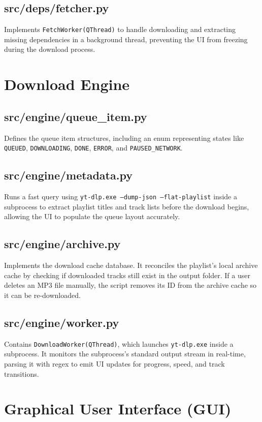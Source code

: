 \documentclass[12pt]{report}
\begin{document}
\subsection{src/deps/fetcher.py}
Implements \texttt{FetchWorker(QThread)} to handle downloading and extracting missing dependencies in a background thread, preventing the UI from freezing during the download process.

\section{Download Engine}

\subsection{src/engine/queue\_item.py}
Defines the queue item structures, including an enum representing states like \texttt{QUEUED}, \texttt{DOWNLOADING}, \texttt{DONE}, \texttt{ERROR}, and \texttt{PAUSED\_NETWORK}.

\subsection{src/engine/metadata.py}
Runs a fast query using \texttt{yt-dlp.exe --dump-json --flat-playlist} inside a subprocess to extract playlist titles and track lists before the download begins, allowing the UI to populate the queue layout accurately.

\subsection{src/engine/archive.py}
Implements the download cache database. It reconciles the playlist's local archive cache by checking if downloaded tracks still exist in the output folder. If a user deletes an MP3 file manually, the script removes its ID from the archive cache so it can be re-downloaded.

\subsection{src/engine/worker.py}
Contains \texttt{DownloadWorker(QThread)}, which launches \texttt{yt-dlp.exe} inside a subprocess. It monitors the subprocess's standard output stream in real-time, parsing it with regex to emit UI updates for progress, speed, and track transitions.

\section{Graphical User Interface (GUI)}
\end{document}
